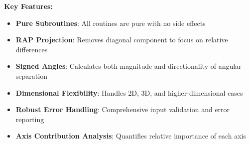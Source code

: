 \documentclass[11pt]{article}
\begin{document}
\textbf{Key Features:}
\begin{itemize}
    \item \textbf{Pure Subroutines}: All routines are pure with no side effects
    \item \textbf{RAP Projection}: Removes diagonal component to focus on relative differences
    \item \textbf{Signed Angles}: Calculates both magnitude and directionality of angular separation
    \item \textbf{Dimensional Flexibility}: Handles 2D, 3D, and higher-dimensional cases
    \item \textbf{Robust Error Handling}: Comprehensive input validation and error reporting
    \item \textbf{Axis Contribution Analysis}: Quantifies relative importance of each axis
\end{itemize}
\end{document}
